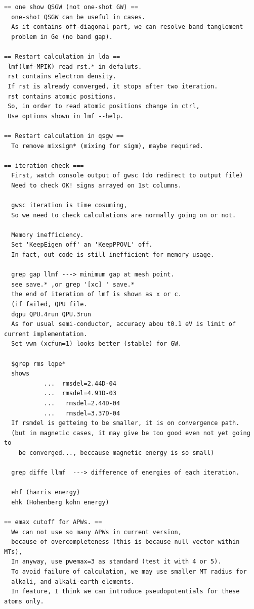 \documentclass[a4paper,10pt,epsf,fleqn]{article}
\begin{document}
{\begin{enumerate}
\end{enumerate}
\begin{verbatim}


== one show QSGW (not one-shot GW) ==
  one-shot QSGW can be useful in cases.
  As it contains off-diagonal part, we can resolve band tanglement
  problem in Ge (no band gap).

== Restart calculation in lda ==
 lmf(lmf-MPIK) read rst.* in defaluts.
 rst contains electron density.
 If rst is already converged, it stops after two iteration.
 rst contains atomic positions.
 So, in order to read atomic positions change in ctrl,
 Use options shown in lmf --help.

== Restart calculation in qsgw ==
  To remove mixsigm* (mixing for sigm), maybe required.

== iteration check ===
  First, watch console output of gwsc (do redirect to output file)
  Need to check OK! signs arrayed on 1st columns.

  gwsc iteration is time cosuming,
  So we need to check calculations are normally going on or not.

  Memory inefficiency.
  Set 'KeepEigen off' an 'KeepPPOVL' off.
  In fact, out code is still inefficient for memory usage.
  
  grep gap llmf ---> minimum gap at mesh point.
  see save.* ,or grep '[xc] ' save.*
  the end of iteration of lmf is shown as x or c.
  (if failed, QPU file. 
  dqpu QPU.4run QPU.3run
  As for usual semi-conductor, accuracy abou t0.1 eV is limit of current implementation.
  Set vwn (xcfun=1) looks better (stable) for GW.

  $grep rms lqpe* 
  shows
           ...  rmsdel=2.44D-04
           ...  rmsdel=4.91D-03
           ...   rmsdel=2.44D-04
           ...   rmsdel=3.37D-04
  If rsmdel is getteing to be smaller, it is on convergence path.
  (but in magnetic cases, it may give be too good even not yet going to
	be converged..., beccause magnetic energy is so small)

  grep diffe llmf  ---> difference of energies of each iteration.

  ehf (harris energy)
  ehk (Hohenberg kohn energy)

== emax cutoff for APWs. ==
  We can not use so many APWs in current version,
  because of overcompleteness (this is because null vector within MTs), 
  In anyway, use pwemax=3 as standard (test it with 4 or 5).
  To avoid failure of calculation, we may use smaller MT radius for
  alkali, and alkali-earth elements. 
  In feature, I think we can introduce pseudopotentials for these atoms only.


\end{verbatim}}
\end{document}
